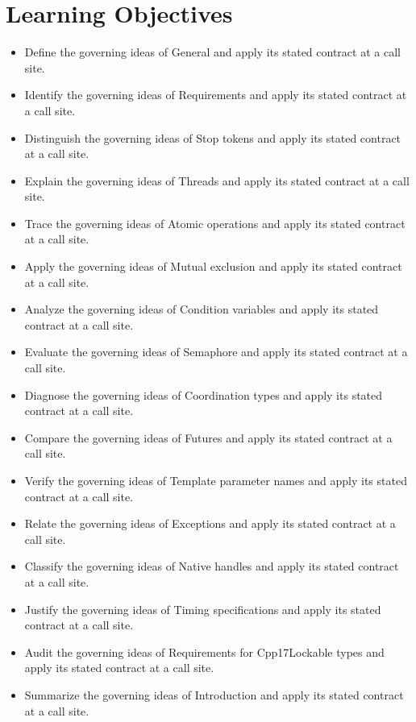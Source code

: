 \documentclass[11pt,letterpaper]{article}
\begin{document}
\section{Learning Objectives}
\begin{itemize}[label=\textcolor{CornellReferenceTeal}{$\blacktriangleright$}]
\item Define the governing ideas of General and apply its stated contract at a call site.
\item Identify the governing ideas of Requirements and apply its stated contract at a call site.
\item Distinguish the governing ideas of Stop tokens and apply its stated contract at a call site.
\item Explain the governing ideas of Threads and apply its stated contract at a call site.
\item Trace the governing ideas of Atomic operations and apply its stated contract at a call site.
\item Apply the governing ideas of Mutual exclusion and apply its stated contract at a call site.
\item Analyze the governing ideas of Condition variables and apply its stated contract at a call site.
\item Evaluate the governing ideas of Semaphore and apply its stated contract at a call site.
\item Diagnose the governing ideas of Coordination types and apply its stated contract at a call site.
\item Compare the governing ideas of Futures and apply its stated contract at a call site.
\item Verify the governing ideas of Template parameter names and apply its stated contract at a call site.
\item Relate the governing ideas of Exceptions and apply its stated contract at a call site.
\item Classify the governing ideas of Native handles and apply its stated contract at a call site.
\item Justify the governing ideas of Timing specifications and apply its stated contract at a call site.
\item Audit the governing ideas of Requirements for Cpp17Lockable types and apply its stated contract at a call site.
\item Summarize the governing ideas of Introduction and apply its stated contract at a call site.
\end{itemize}
\end{document}
